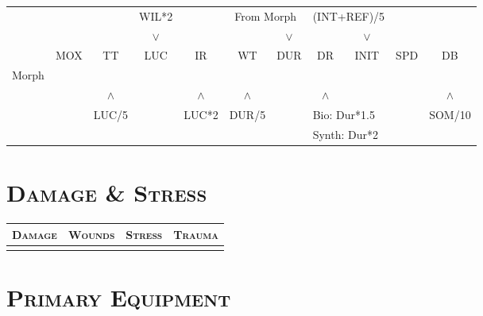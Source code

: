 \documentclass[a4paper,9pt]{article}
\begin{document}
\begin{tabular}{r|c|c|c|c|c|c|c|c|c|c}
   \multicolumn{1}{c}{}&
   \multicolumn{1}{c}{}&
   \multicolumn{1}{c}{}&
   \multicolumn{1}{c}{\tiny{WIL*2}}&
   \multicolumn{1}{c}{}&
   \multicolumn{2}{c}{\tiny{From Morph}}&
   \multicolumn{2}{r}{\tiny{(INT+REF)/5}}&
   \multicolumn{1}{c}{}&
   \multicolumn{1}{c}{}\\

   \multicolumn{1}{c}{}&
   \multicolumn{1}{c}{}&
   \multicolumn{1}{c}{}&
   \multicolumn{1}{c}{$\vee$}&
   \multicolumn{1}{c}{}&
   \multicolumn{1}{c}{}&
   \multicolumn{1}{c}{$\vee$}&
   \multicolumn{1}{c}{}&
   \multicolumn{1}{c}{$\vee$}&
   \multicolumn{1}{c}{}&
   \multicolumn{1}{c}{}\\


   & MOX & TT & LUC & IR & WT & DUR & DR & INIT & SPD & DB\\ \hline
   Morph  &&&&&&&&&&\\\hline

   \multicolumn{1}{c}{}&
   \multicolumn{1}{c}{}&
   \multicolumn{1}{c}{$\wedge$}&
   \multicolumn{1}{c}{}&
   \multicolumn{1}{c}{$\wedge$}&
   \multicolumn{1}{c}{$\wedge$}&
   \multicolumn{1}{c}{}&
   \multicolumn{1}{c}{$\wedge$}&
   \multicolumn{1}{c}{}&
   \multicolumn{1}{c}{}&
   \multicolumn{1}{c}{$\wedge$}\\

   \multicolumn{1}{c}{}&
   \multicolumn{1}{c}{}&
   \multicolumn{1}{c}{\tiny{LUC/5}}&
   \multicolumn{1}{c}{}&
   \multicolumn{1}{c}{\tiny{LUC*2}}&
   \multicolumn{1}{c}{\tiny{DUR/5}}&
   \multicolumn{1}{c}{}&
   \multicolumn{3}{l}{\tiny{Bio: Dur*1.5}}&
   \multicolumn{1}{c}{\tiny{SOM/10}}\\
   \multicolumn{1}{c}{}&
   \multicolumn{1}{c}{}&
   \multicolumn{1}{c}{}&
   \multicolumn{1}{c}{}&
   \multicolumn{1}{c}{}&
   \multicolumn{1}{c}{}&
   \multicolumn{1}{c}{}&
   \multicolumn{3}{l}{\tiny{Synth: Dur*2}}&
   \multicolumn{1}{c}{}\\

\end{tabular}


\section*{\textsc{Damage \& Stress}}

\begin{tabular}{c|c|c|c}
   \textsc{Damage} & \textsc{Wounds} & \textsc{Stress} & \textsc{Trauma}\\\hline
   &&&
\end{tabular}

\section{\textsc{Primary Equipment}}




\end{document}
